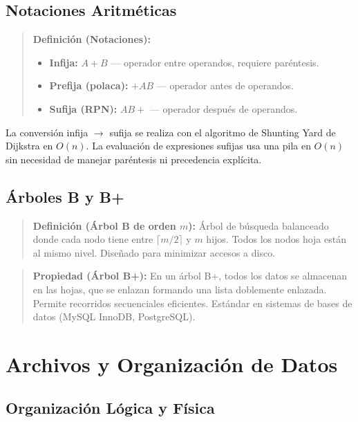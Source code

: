 \documentclass[12pt, letterpaper]{article}
\begin{document}
	\subsection{Notaciones Aritméticas}
	
	\begin{quote}
		\textbf{Definición (Notaciones):}
		\begin{itemize}[noitemsep]
			\item \textbf{Infija:} $A + B$ — operador entre operandos, requiere paréntesis.
			\item \textbf{Prefija (polaca):} $+ A B$ — operador antes de operandos.
			\item \textbf{Sufija (RPN):} $A B +$ — operador después de operandos.
		\end{itemize}
	\end{quote}
	
	La conversión infija $\to$ sufija se realiza con el algoritmo de Shunting Yard de Dijkstra en $O(n)$. La evaluación de expresiones sufijas usa una pila en $O(n)$ sin necesidad de manejar paréntesis ni precedencia explícita.
	
	\subsection{Árboles B y B+}
	
	\begin{quote}
		\textbf{Definición (Árbol B de orden $m$):}
		Árbol de búsqueda balanceado donde cada nodo tiene entre $\lceil m/2 \rceil$ y $m$ hijos. Todos los nodos hoja están al mismo nivel. Diseñado para minimizar accesos a disco.
	\end{quote}
	
	\begin{quote}
		\textbf{Propiedad (Árbol B+):}
		En un árbol B+, todos los datos se almacenan en las hojas, que se enlazan formando una lista doblemente enlazada. Permite recorridos secuenciales eficientes. Estándar en sistemas de bases de datos (MySQL InnoDB, PostgreSQL).
	\end{quote}
	
	\section{Archivos y Organización de Datos}
	
	\subsection{Organización Lógica y Física}
	
\end{document}
